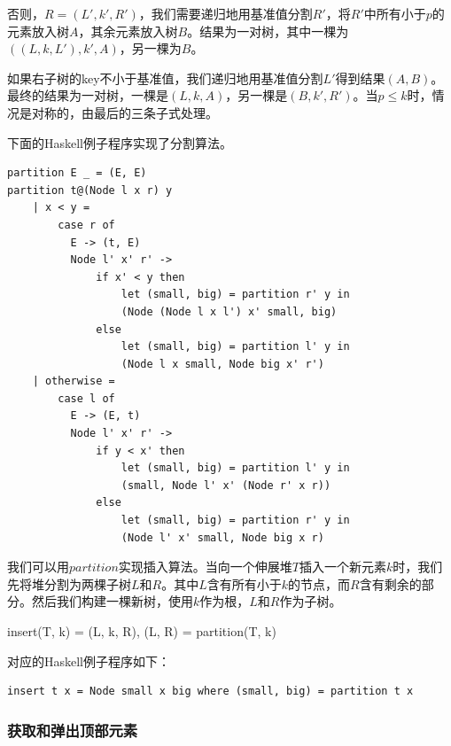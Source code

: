\documentclass[b5paper]{ctexart}
\begin{document}
否则，$R = (L', k', R')$，我们需要递归地用基准值分割$R'$，将$R'$中所有小于$p$的元素放入树$A$，其余元素放入树$B$。结果为一对树，其中一棵为$((L, k, L'), k', A)$，另一棵为$B$。

如果右子树的key不小于基准值，我们递归地用基准值分割$L'$得到结果$(A, B)$。最终的结果为一对树，一棵是$(L, k, A)$，另一棵是$(B, k', R')$。当$p \leq k$时，情况是对称的，由最后的三条子式处理。

下面的Haskell例子程序实现了分割算法。

\begin{lstlisting}[style=Haskell]
partition E _ = (E, E)
partition t@(Node l x r) y
    | x < y =
        case r of
          E -> (t, E)
          Node l' x' r' ->
              if x' < y then
                  let (small, big) = partition r' y in
                  (Node (Node l x l') x' small, big)
              else
                  let (small, big) = partition l' y in
                  (Node l x small, Node big x' r')
    | otherwise =
        case l of
          E -> (E, t)
          Node l' x' r' ->
              if y < x' then
                  let (small, big) = partition l' y in
                  (small, Node l' x' (Node r' x r))
              else
                  let (small, big) = partition r' y in
                  (Node l' x' small, Node big x r)
\end{lstlisting}

我们可以用$partition$实现插入算法。当向一个伸展堆$T$插入一个新元素$k$时，我们先将堆分割为两棵子树$L$和$R$。其中$L$含有所有小于$k$的节点，而$R$含有剩余的部分。然后我们构建一棵新树，使用$k$作为根，$L$和$R$作为子树。

\be
insert(T, k) = (L, k, R), (L, R) = partition(T, k)
\ee

对应的Haskell例子程序如下：

\lstset{language=Haskell}
\begin{lstlisting}[style=Haskell]
insert t x = Node small x big where (small, big) = partition t x
\end{lstlisting}

\subsubsection{获取和弹出顶部元素}
\end{document}
